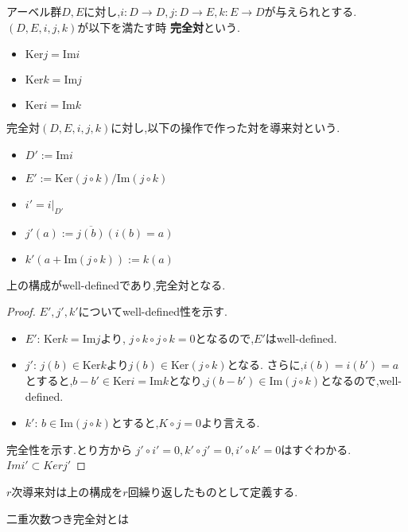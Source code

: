 \begin{dfn}
アーベル群$D,E$に対し,$i:D \to D,j:D \to E, k:E \to D$が与えられとする.
$(D,E,i,j,k)$が以下を満たす時 \textbf{完全対}という.
\begin{itemize}
  \item $\mathrm{Ker}j = \mathrm{Im}i$
  \item $\mathrm{Ker}k = \mathrm{Im}j$
  \item $\mathrm{Ker}i = \mathrm{Im}k$
\end{itemize}
\end{dfn}

\begin{dfn}
完全対$(D,E,i,j,k)$に対し,以下の操作で作った対を導来対という.
\begin{itemize}
    \item $D':=\mathrm{Im}i$
    \item $E':=\mathrm{Ker}(j \circ k)/ \mathrm{Im}(j \circ k)$
    \item $i'=i|_{D'}$
    \item $j'(a):= \overline{j(b)}(i(b)=a)$
    \item $k'(a + \mathrm{Im}(j \circ k )):= k(a)$
\end{itemize}
\end{dfn}

\begin{prop}
上の構成がwell-definedであり,完全対となる.
\end{prop}
\begin{proof}
$E',j',k'$についてwell-defined性を示す.
\begin{itemize}
    \item $E'$: 
$\mathrm{Ker}k = \mathrm{Im}j $より, $j \circ k\circ j \circ k = 0$となるので,$E'$はwell-defined.
\item $j'$:
$j(b) \in \mathrm{Ker}k$より$j(b) \in \mathrm{Ker}(j \circ k)$となる.
さらに,$i(b)=i(b')=a$とすると,$b-b' \in \mathrm{Ker}i = \mathrm{Im} k$となり,$j(b-b') \in \mathrm{Im}(j \circ k)$となるので,well-defined.
\item $k'$: $b \in \mathrm{Im}(j \circ k)$とすると,$K \circ j = 0$より言える.
\end{itemize}
完全性を示す.とり方から
$j'\circ i' = 0, k' \circ j' =0, i' \circ k' = 0$はすぐわかる.
$Im i' \subset Ker j'$

\end{proof}


$r$次導来対は上の構成を$r$回繰り返したものとして定義する.

\begin{dfn}
二重次数つき完全対とは
\end{dfn}

